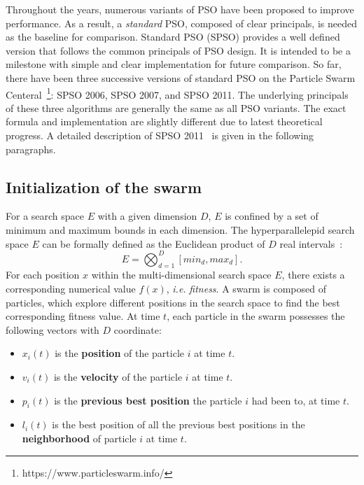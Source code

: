 Throughout the years, numerous variants of PSO have been proposed to improve performance.
As a result, a \textit{standard} PSO, composed of clear principals, is needed as the baseline for comparison.
Standard PSO (SPSO) provides a well defined version that follows the common principals of PSO design.
It is intended to be a milestone with simple and clear implementation for future comparison. %
So far, there have been three successive versions of standard PSO on the Particle Swarm Centeral~\footnote{https://www.particleswarm.info/}: SPSO 2006, SPSO 2007, and SPSO 2011.
The underlying principals of these three algorithms are generally the same as all PSO variants.
The exact formula and implementation are slightly different due to latest theoretical progress.
A detailed description of SPSO 2011~\cite{Zambrano:2013:SPSO2011} is given in the following paragraphs.

\subsection{Initialization of the swarm}

For a search space $E$ with a given dimension $D$, $E$ is confined by a set of minimum and maximum bounds in each dimension.
The hyperparallelepid search space $E$ can be formally defined as the Euclidean product of $D$ real intervals~\cite{Clerc:2012:SPSO2011}:
\begin{displaymath}
E = \bigotimes_{d=1}^{D}[min_d, max_d].
\end{displaymath}
For each position $x$ within the multi-dimensional search space $E$, there exists a corresponding numerical value $f(x)$, \textit{i.e.} \textit{fitness}.
A swarm is composed of particles, which explore different positions in the search space to find the best corresponding fitness value.
At time $t$, each particle in the swarm possesses the following vectors with $D$ coordinate:
\begin{itemize}
\item $x_i(t)$ is the \textbf{position} of the particle $i$ at time $t$.
\item $v_i(t)$ is the \textbf{velocity} of the particle $i$ at time $t$.
\item $p_i(t)$ is the \textbf{previous best position} the particle $i$ had been to, at time $t$.
\item $l_i(t)$ is the best position of all the previous best positions in the \textbf{neighborhood} of particle $i$ at time $t$.
\end{itemize}

